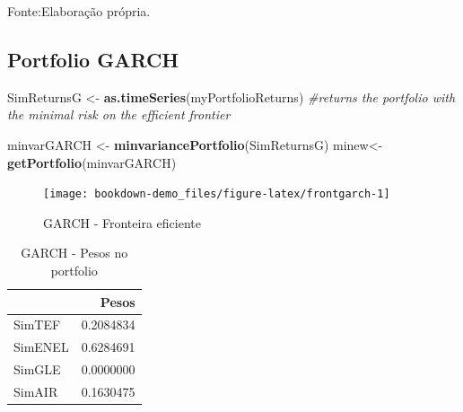\documentclass[
  12pt,
  a4paper,
  openany]{book}
\newenvironment{Shaded}{\begin{snugshade}}{\end{snugshade}}
\newcommand{\CommentTok}[1]{\textcolor[rgb]{0.56,0.35,0.01}{\textit{#1}}}
\newcommand{\DataTypeTok}[1]{\textcolor[rgb]{0.13,0.29,0.53}{#1}}
\newcommand{\DecValTok}[1]{\textcolor[rgb]{0.00,0.00,0.81}{#1}}
\newcommand{\FloatTok}[1]{\textcolor[rgb]{0.00,0.00,0.81}{#1}}
\newcommand{\KeywordTok}[1]{\textcolor[rgb]{0.13,0.29,0.53}{\textbf{#1}}}
\newcommand{\NormalTok}[1]{#1}
\newcommand{\OperatorTok}[1]{\textcolor[rgb]{0.81,0.36,0.00}{\textbf{#1}}}
\newcommand{\StringTok}[1]{\textcolor[rgb]{0.31,0.60,0.02}{#1}}
\begin{document}
Fonte:Elaboração própria.

\justifying
\bigskip

\hypertarget{portfolio-garch}{%
\subsection{Portfolio GARCH}\label{portfolio-garch}}

\scriptsize

\begin{Shaded}
\begin{Highlighting}[]
\NormalTok{SimReturnsG \textless{}{-}}\StringTok{ }\KeywordTok{as.timeSeries}\NormalTok{(myPortfolioReturns)}
\CommentTok{\#returns the portfolio with the minimal risk on the efficient frontier}

\NormalTok{minvarGARCH \textless{}{-}}\StringTok{ }\KeywordTok{minvariancePortfolio}\NormalTok{(SimReturnsG) }
\NormalTok{minew\textless{}{-}}\KeywordTok{getPortfolio}\NormalTok{(minvarGARCH)}
\end{Highlighting}
\end{Shaded}

\normalsize

\begin{figure}

{\centering \texttt{[image: bookdown-demo\_files/figure-latex/frontgarch-1]} 

}

\caption{GARCH - Fronteira eficiente}\label{fig:frontgarch}
\end{figure}

\begin{table}[!h]

\caption{\label{tab:unnamed-chunk-44}GARCH - Pesos no portfolio}
\centering
\begin{tabular}[t]{lr}
\toprule
  & Pesos\\
\midrule
SimTEF & 0.2084834\\
SimENEL & 0.6284691\\
SimGLE & 0.0000000\\
SimAIR & 0.1630475\\
\bottomrule
\end{tabular}
\end{table}

\scriptsize

\begin{Shaded}
\end{Shaded}
\end{document}
